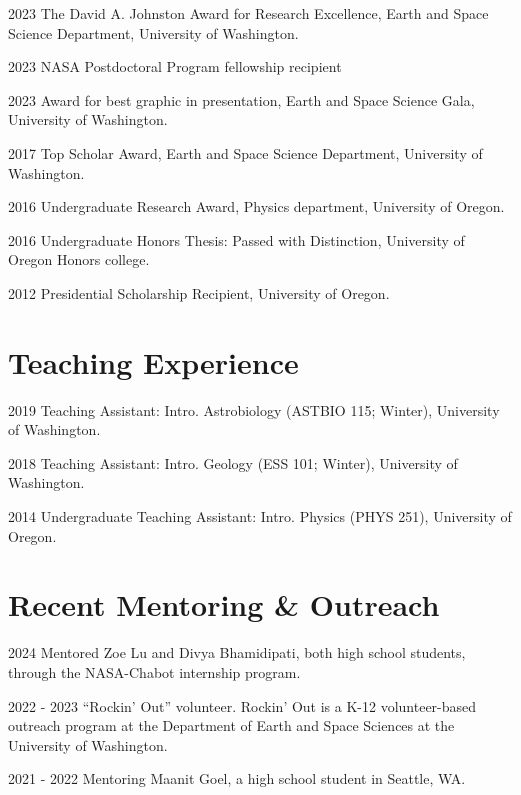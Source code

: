\documentclass{article}
\begin{document}
\begin{cvlist}
\item[2023]
  The David A. Johnston Award for Research Excellence, Earth and Space Science Department, University of Washington.
\item[2023] 
  NASA Postdoctoral Program fellowship recipient
\item[2023]
  Award for best graphic in presentation, Earth and Space Science Gala, University of Washington.
\item[2017]
  Top Scholar Award, Earth and Space Science Department, University of Washington.
\item[2016]
  Undergraduate Research Award, Physics department, University of Oregon.
\item[2016]
  Undergraduate Honors Thesis: Passed with Distinction, University of Oregon Honors college.
\item[2012]
  Presidential Scholarship Recipient, University of Oregon.
\end{cvlist}

\section{Teaching Experience}

\begin{cvlist}
\item[2019]
  Teaching Assistant: Intro. Astrobiology (ASTBIO 115; Winter), University of Washington.
\item[2018]
  Teaching Assistant: Intro. Geology (ESS 101; Winter), University of Washington.
\item[2014]
  Undergraduate Teaching Assistant: Intro. Physics (PHYS 251), University of Oregon.
\end{cvlist}

\section{Recent Mentoring \& Outreach}

\begin{cvlist}
\item[2024]
  Mentored Zoe Lu and Divya Bhamidipati, both high school students, through the NASA-Chabot internship program.
\item[2022 - 2023]
  ``Rockin' Out'' volunteer. Rockin' Out is a K-12 volunteer-based outreach program at the Department of Earth and Space Sciences at the University of Washington.
\item[2021 - 2022]
  Mentoring Maanit Goel, a high school student in Seattle, WA.
\end{cvlist}
\end{document}
